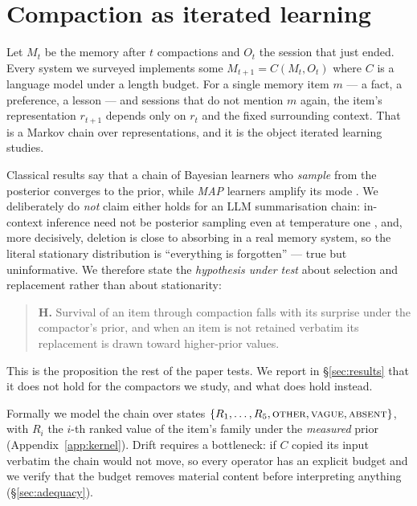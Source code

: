 \section{Compaction as iterated learning}
\label{sec:background}

Let $M_t$ be the memory after $t$ compactions and $O_t$ the session that just ended. Every system we
surveyed implements some $M_{t+1} = C(M_t, O_t)$ where $C$ is a language model under a length
budget. For a single memory item $m$ --- a fact, a preference, a lesson --- and sessions that do not
mention $m$ again, the item's representation $r_{t+1}$ depends only on $r_t$ and the fixed
surrounding context. That is a Markov chain over representations, and it is the object iterated
learning studies.

Classical results say that a chain of Bayesian learners who \emph{sample} from the posterior
converges to the prior, while \emph{MAP} learners amplify its mode
\citep{griffiths2007language,kirby2007innateness}. We deliberately do \emph{not} claim either holds
for an LLM summarisation chain: in-context inference need not be posterior sampling even at
temperature one \citep{cui2025sharper}, and, more decisively, deletion is close to absorbing in a real
memory system, so the literal stationary distribution is ``everything is forgotten'' --- true but
uninformative. We therefore state the \emph{hypothesis under test} about selection and replacement
rather than about stationarity:

\begin{quote}
\textbf{H.} Survival of an item through compaction falls with its surprise under the compactor's
prior, and when an item is not retained verbatim its replacement is drawn toward higher-prior values.
\end{quote}

\noindent This is the proposition the rest of the paper tests. We report in \S\ref{sec:results}
that it does not hold for the compactors we study, and what does hold instead.

Formally we model the chain over states $\{R_1,\dots,R_5,\textsc{other},\textsc{vague},
\textsc{absent}\}$, with $R_i$ the $i$-th ranked value of the item's family under the \emph{measured}
prior (Appendix~\ref{app:kernel}). Drift requires a bottleneck: if $C$ copied its input verbatim the
chain would not move, so every operator has an explicit budget and we verify that the budget removes
material content before interpreting anything (\S\ref{sec:adequacy}).

